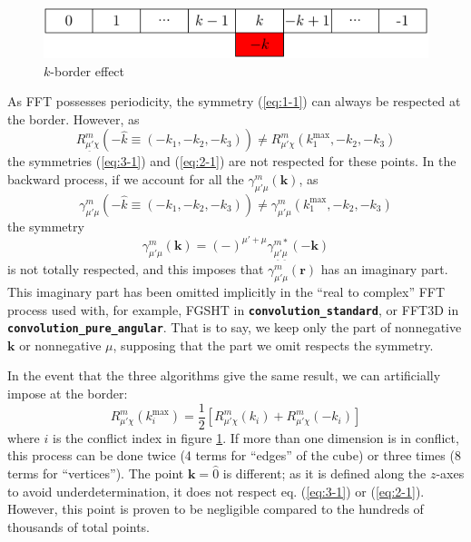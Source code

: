 \begin{figure}[H]
\begin{centering}
\includegraphics{_figure/k-border}
\par\end{centering}
\caption{$k$-border effect\label{fig:k-border-effect}}
\end{figure}

As \acs{FFT} possesses periodicity, the symmetry (\ref{eq:1-1})
can always be respected at the border. However, as
\begin{equation}
R_{\underline{\mu'}\chi}^{m}(-\hat{k}\equiv(-k_{1},-k_{2},-k_{3}))\neq R_{\mu'\chi}^{m}(k_{1}^{\mathrm{max}},-k_{2},-k_{3})
\end{equation}
the symmetries (\ref{eq:3-1}) and (\ref{eq:2-1}) are not respected
for these points. In the backward process, if we account for all the
$\gamma_{\mu'\mu}^{m}(\mathbf{k})$, as
\begin{equation}
\gamma_{\mu'\mu}^{m}(-\hat{k}\equiv(-k_{1},-k_{2},-k_{3}))\neq\gamma_{\mu'\mu}^{m}(k_{1}^{\mathrm{max}},-k_{2},-k_{3})
\end{equation}
the symmetry
\begin{equation}
\gamma_{\mu'\mu}^{m}(\mathbf{k})=(-)^{\mu'+\mu}\gamma_{\underline{\mu'}\underline{\mu}}^{m*}(-\mathbf{k})\label{eq:4-1}
\end{equation}
is not totally respected, and this imposes that $\gamma_{\mu'\mu}^{m}(\mathbf{r})$
has an imaginary part. This imaginary part has been omitted implicitly
in the ``real to complex'' \acs{FFT} process used with, for example,
\acs{FGSHT} in \texttt{\textbf{convolution\_standard}}, or \acs{FFT}3D
in \texttt{\textbf{convolution\_pure\_angular}}. That is to say, we
keep only the part of nonnegative $\mathbf{k}$ or nonnegative $\mu$,
supposing that the part we omit respects the symmetry.

In the event that the three algorithms give the same result, we
can artificially impose at the border:
\begin{equation}
R_{\mu'\chi}^{m}(k_{i}^{\mathrm{max}})=\frac{1}{2}\left[R_{\mu'\chi}^{m}(k_{i})+R_{\mu'\chi}^{m}(-k_{i})\right]
\end{equation}
where $i$ is the conflict index in figure \ref{fig:k-border-effect}.
If more than one dimension is in conflict, this process can be done
twice (4 terms for ``edges'' of the cube) or three times (8 terms
for ``vertices''). The point $\mathbf{k}=\hat{0}$ is different;
as it is defined along the $z$-axes to avoid underdetermination,
it does not respect eq. (\ref{eq:3-1}) or (\ref{eq:2-1}).
However, this point is proven to be negligible compared to the hundreds
of thousands of total points.

